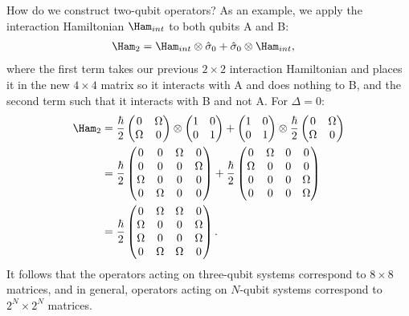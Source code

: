 \documentclass[lasers.tex]{subfiles}
\begin{document}
How do we construct two-qubit operators?
As an example, we apply the interaction Hamiltonian $\Ham_{int}$ to both qubits A and B:
\begin{align}
    \Ham_2 &= \Ham_{int}\otimes\hat{\sigma}_0 + \hat{\sigma}_0\otimes\Ham_{int},
\end{align}
where the first term takes our previous $2\times2$ interaction Hamiltonian and places it in the new $4\times4$ matrix so it interacts with A and does nothing to B, and the second term such that it interacts with B and not A.
For $\Delta=0$:
\begin{align}
    \Ham_2 &= \frac{\hbar}{2}\begin{pmatrix}0&\Omega\\\Omega&0\end{pmatrix}\otimes\begin{pmatrix}1&0\\0&1\end{pmatrix} + \begin{pmatrix} 1&0\\0&1\end{pmatrix}\otimes\frac{\hbar}{2}\begin{pmatrix}0&\Omega\\\Omega&0\end{pmatrix} \\
           &= \frac{\hbar}{2}\begin{pmatrix} 0 & 0 & \Omega & 0 \\ 0 & 0 & 0 & \Omega \\ \Omega & 0 & 0 & 0 \\ 0 & \Omega & 0 & 0 \end{pmatrix} +\frac{\hbar}{2} \begin{pmatrix} 0 & \Omega & 0 & 0 \\ \Omega & 0 & 0 & 0 \\ 0 & 0 & 0 & \Omega \\ 0 & 0 & 0 & \Omega\end{pmatrix} \\
           &= \frac{\hbar}{2} \begin{pmatrix} 0 &\Omega & \Omega & 0 \\ \Omega & 0 & 0 &\Omega \\ \Omega & 0 & 0 & \Omega \\ 0 & \Omega & \Omega & 0 \end{pmatrix}.
\end{align}
It follows that the operators acting on three-qubit systems correspond to $8\times8$ matrices, and in general, operators acting on $N$-qubit systems correspond to $2^N\times2^N$ matrices.
\end{document}
